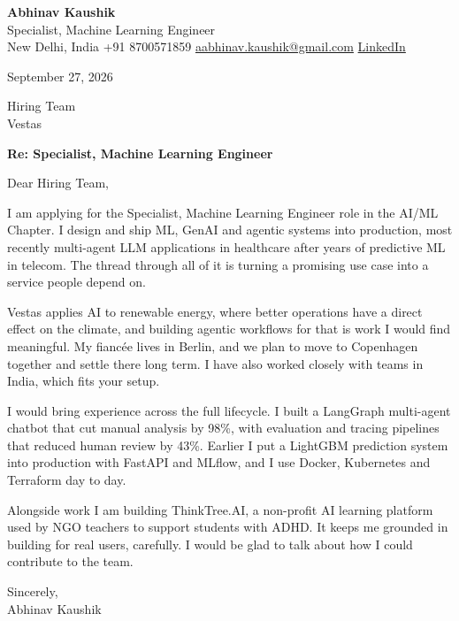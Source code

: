 \documentclass[11pt,a4paper]{article}
\begin{document}
{\Large\bfseries Abhinav Kaushik}\\
Specialist, Machine Learning Engineer\\
New Delhi, India \textbar{} +91 8700571859 \textbar{} \href{mailto:aabhinav.kaushik@gmail.com}{aabhinav.kaushik@gmail.com} \textbar{} \href{https://www.linkedin.com/in/abhinav-kaushik10/}{LinkedIn}  

September 27, 2026

Hiring Team\\
Vestas

\textbf{Re: Specialist, Machine Learning Engineer}

Dear Hiring Team,

I am applying for the Specialist, Machine Learning Engineer role in the AI/ML Chapter. I design and ship ML, GenAI and agentic systems into production, most recently multi-agent LLM applications in healthcare after years of predictive ML in telecom. The thread through all of it is turning a promising use case into a service people depend on.

Vestas applies AI to renewable energy, where better operations have a direct effect on the climate, and building agentic workflows for that is work I would find meaningful. My fiancée lives in Berlin, and we plan to move to Copenhagen together and settle there long term. I have also worked closely with teams in India, which fits your setup.

I would bring experience across the full lifecycle. I built a LangGraph multi-agent chatbot that cut manual analysis by 98\%, with evaluation and tracing pipelines that reduced human review by 43\%. Earlier I put a LightGBM prediction system into production with FastAPI and MLflow, and I use Docker, Kubernetes and Terraform day to day.

Alongside work I am building ThinkTree.AI, a non-profit AI learning platform used by NGO teachers to support students with ADHD. It keeps me grounded in building for real users, carefully. I would be glad to talk about how I could contribute to the team.

Sincerely,\\[4pt]
Abhinav Kaushik
\end{document}
